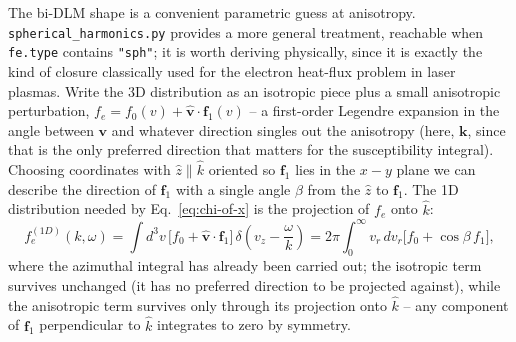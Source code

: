 \documentclass[11pt]{article}
\newcommand{\code}[1]{\texttt{#1}}
\newcommand{\file}[1]{\texttt{#1}}
\begin{document}
The bi-DLM shape is a convenient parametric guess at anisotropy. \file{spherical\_harmonics.py}
provides a more general treatment, reachable when \code{fe.type} contains \code{"sph"};
it is worth deriving physically, since it is exactly the kind of closure classically
used for the electron heat-flux problem in laser plasmas. Write the 3D distribution as an
isotropic piece plus a small anisotropic perturbation, $f_e = f_0(v) + \hat{\mathbf
v}\cdot\mathbf f_1(v)$ -- a first-order Legendre expansion in the angle between $\mathbf v$
and whatever direction singles out the anisotropy (here, $\mathbf k$, since that is the
only preferred direction that matters for the susceptibility integral). Choosing
coordinates with $\hat z\parallel\hat k$ oriented so $\mathbf f_1$ lies in the $x-y$ plane we can describe the direction of $\mathbf f_1$ with a single angle $\beta$ from the $\hat z$ to $\mathbf f_1$. The 1D distribution needed by Eq.~\ref{eq:chi-of-x} is the projection
of $f_e$ onto $\hat k$:
\begin{equation}
  f_e^{(1D)}(k,\omega) = \int d^3v\,\big[f_0+\hat{\mathbf v}\cdot\mathbf f_1\big]\,
  \delta\!\left(v_z-\frac{\omega}{k}\right)
  = 2\pi\int_0^\infty v_r\,dv_r\Big[f_0 + \cos\beta\,f_1\Big],
\end{equation}
where the azimuthal integral has already been carried out; the isotropic term survives
unchanged (it has no preferred direction to be projected against), while the anisotropic
term survives only through its projection onto $\hat k$ -- any component of $\mathbf f_1$
perpendicular to $\hat k$ integrates to zero by symmetry.
\end{document}
